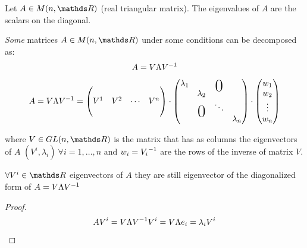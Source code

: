 \documentclass[computationalMathematics.tex]{subfiles}
\begin{document}
\begin{theorem}
  Let $A \in M(n, \R)$ (real triangular matrix). The eigenvalues of $A$ are the scalars on the diagonal.
\end{theorem}


\begin{definition}
 \emph{Some} matrices $A \in M(n, \R)$ under some conditions can be decomposed as:
\[
  A = V \Lambda {V}^{-1}
\]
\[
  A = V \Lambda \inv{V} = \begin{pmatrix}
    \\
    V^1 & V^2 & \cdots & V^n\\
    \\
  \end{pmatrix}
  \cdot 
  \begin{pmatrix}
    \lambda_1&&\bigzero\\
    &\lambda_2\\
    &\bigzero& \ddots\\
    &&&\lambda_n\\
  \end{pmatrix}
  \cdot 
  \begin{pmatrix}
    w_1\\
    w_2\\
    \vdots\\
    w_n\\
  \end{pmatrix}
\]

  where $V \in GL(n, \R)$ is the matrix that has as columns the eigenvectors of $A$ $(V^i, \lambda_i)~\forall i=1, \ldots, n$ and $w_i = {V_i}^{-1}$ are the rows of the inverse of matrix $V$.\\
\end{definition}

\begin{proposition}
  $\forall V^i \in \R$ eigenvectors of $A$ they are still eigenvector of the diagonalized form of $A=V \Lambda {V}^{-1}$
\end{proposition}

\begin{proof}
  \[
    AV^i = V \Lambda {V}^{-1} V^i = V \Lambda e_i = \lambda_i V^i
  \]
\end{proof}
\end{document}
